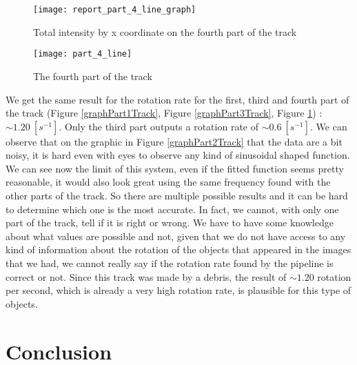 \documentclass[a4paper,12pt,oneside]{report}
\begin{document}
\begin{figure}[h]
    \begin{minipage}[c]{.47\linewidth}
        \centering
        \texttt{[image: report\_part\_4\_line\_graph]}
        \caption{Total intensity by x coordinate on the fourth part of the track}
        \label{graphPart4Track}
    \end{minipage}
    \hfill
    \begin{minipage}[c]{.47\linewidth}
        \centering
        \texttt{[image: part\_4\_line]}
        \caption{The fourth part of the track}
    \end{minipage}
\end{figure}
\newline
\newline
\newline
\newline
\newline
\newline
We get the same result for the rotation rate for the first, third and fourth part of the track (Figure \ref{graphPart1Track}, 
Figure \ref{graphPart3Track}, Figure \ref{graphPart4Track}) : $\sim 1.20\ [s^{-1}]$. Only the third part outputs a rotation rate 
of $\sim 0.6\ [s^{-1}]$. We can observe that on the graphic in Figure \ref{graphPart2Track} that the data are a bit noisy, it is hard
even with eyes to observe any kind of sinusoidal shaped function. We can see now the limit of this system, even if the fitted function 
seems pretty reasonable, it would also look great using the same frequency found with the other parts of the track. So there are multiple
possible results and it can be hard to determine which one is the most accurate. In fact, we cannot, with only one part of the track,
tell if it is right or wrong. We have to have some knowledge about what values are possible and not, given that we do not have access 
to any kind of information about the rotation of the objects that appeared in the images that we had, we cannot really say if the rotation
rate found by the pipeline is correct or not. 
\newline
Since this track was made by a debris, the result of $\sim 1.20$ rotation per second, which is already a very high rotation rate, 
is plausible for this type of objects. 


\chapter{Conclusion}
\end{document}
